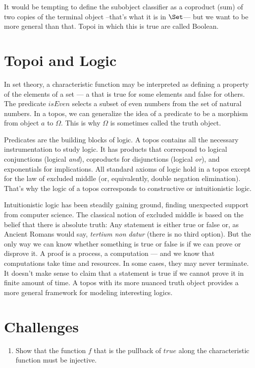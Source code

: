 It would be tempting to define the subobject classifier as a coproduct
(sum) of two copies of the terminal object --that's what it is in
$\Set$--- but we want to be more general than that. Topoi in which
this is true are called Boolean.

\section{Topoi and Logic}

In set theory, a characteristic function may be interpreted as defining
a property of the elements of a set --- a  that is true
for some elements and false for others. The predicate $isEven$
selects a subset of even numbers from the set of natural numbers. In a
topos, we can generalize the idea of a predicate to be a morphism from
object $a$ to $\Omega$. This is why $\Omega$ is sometimes
called the truth object.

Predicates are the building blocks of logic. A topos contains all the
necessary instrumentation to study logic. It has products that
correspond to logical conjunctions (logical \emph{and}), coproducts for
disjunctions (logical \emph{or}), and exponentials for implications. All
standard axioms of logic hold in a topos except for the law of excluded
middle (or, equivalently, double negation elimination). That's why the
logic of a topos corresponds to constructive or intuitionistic logic.

Intuitionistic logic has been steadily gaining ground, finding
unexpected support from computer science. The classical notion of
excluded middle is based on the belief that there is absolute truth: Any
statement is either true or false or, as Ancient Romans would say,
\emph{tertium non datur} (there is no third option). But the only way we
can know whether something is true or false is if we can prove or
disprove it. A proof is a process, a computation --- and we know that
computations take time and resources. In some cases, they may never
terminate. It doesn't make sense to claim that a statement is true if we
cannot prove it in finite amount of time. A topos with its more nuanced
truth object provides a more general framework for modeling interesting
logics.

\section{Challenges}

\begin{enumerate}
\tightlist
\item
  Show that the function $f$ that is the pullback of
  $true$ along the characteristic function must be injective.
\end{enumerate}
